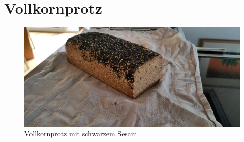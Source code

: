 %
%
%


\section{Vollkornprotz}  

\begin{figure}[H]
    \centering
    \includegraphics[width=0.7\linewidth]{Bilder/Vollkornprotz}
    \caption{Vollkornprotz mit schwarzem Sesam}
    \label{fig:vollkornprotz}
\end{figure}
 
